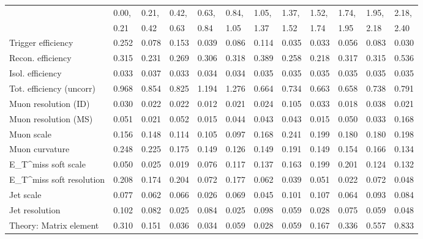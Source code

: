 \begin{tabular}{l|p{0.6cm}p{0.6cm}p{0.6cm}p{0.6cm}p{0.6cm}p{0.6cm}p{0.6cm}p{0.6cm}p{0.6cm}p{0.6cm}p{0.6cm}}
\hline
   & 0.00, & 0.21, & 0.42, & 0.63, & 0.84, & 1.05, & 1.37, & 1.52, & 1.74, & 1.95, & 2.18,  \\ 
   & 0.21 & 0.42 & 0.63 & 0.84 & 1.05 & 1.37 & 1.52 & 1.74 & 1.95 & 2.18 & 2.40  \\ 
\hline
Trigger efficiency                       & 0.252 & 0.078 & 0.153 & 0.039 & 0.086 & 0.114 & 0.035 & 0.033 & 0.056 & 0.083 & 0.030 \\
Recon. efficiency                        & 0.315 & 0.231 & 0.269 & 0.306 & 0.318 & 0.389 & 0.258 & 0.218 & 0.317 & 0.315 & 0.536 \\
Isol. efficiency                         & 0.033 & 0.037 & 0.033 & 0.034 & 0.034 & 0.035 & 0.035 & 0.035 & 0.035 & 0.035 & 0.035 \\
Tot. efficiency (uncorr)                 & 0.968 & 0.854 & 0.825 & 1.194 & 1.276 & 0.664 & 0.734 & 0.663 & 0.658 & 0.738 & 0.791 \\
Muon resolution (ID)                     & 0.030 & 0.022 & 0.022 & 0.012 & 0.021 & 0.024 & 0.105 & 0.033 & 0.018 & 0.038 & 0.021 \\
Muon resolution (MS)                     & 0.051 & 0.021 & 0.052 & 0.015 & 0.044 & 0.043 & 0.043 & 0.015 & 0.050 & 0.033 & 0.168 \\
Muon scale                               & 0.156 & 0.148 & 0.114 & 0.105 & 0.097 & 0.168 & 0.241 & 0.199 & 0.180 & 0.180 & 0.198 \\
Muon curvature                           & 0.248 & 0.225 & 0.175 & 0.149 & 0.126 & 0.149 & 0.191 & 0.149 & 0.154 & 0.166 & 0.134 \\
E_{T}^{miss} soft scale                  & 0.050 & 0.025 & 0.019 & 0.076 & 0.117 & 0.137 & 0.163 & 0.199 & 0.201 & 0.124 & 0.132 \\
E_{T}^{miss} soft resolution             & 0.208 & 0.174 & 0.204 & 0.072 & 0.177 & 0.062 & 0.039 & 0.051 & 0.022 & 0.072 & 0.048 \\
Jet scale                                & 0.077 & 0.062 & 0.066 & 0.026 & 0.069 & 0.045 & 0.101 & 0.107 & 0.064 & 0.093 & 0.084 \\
Jet resolution                           & 0.102 & 0.082 & 0.025 & 0.084 & 0.025 & 0.098 & 0.059 & 0.028 & 0.075 & 0.059 & 0.048 \\
Theory: Matrix element                   & 0.310 & 0.151 & 0.036 & 0.034 & 0.059 & 0.028 & 0.059 & 0.167 & 0.336 & 0.557 & 0.833 \\

\end{tabular}
